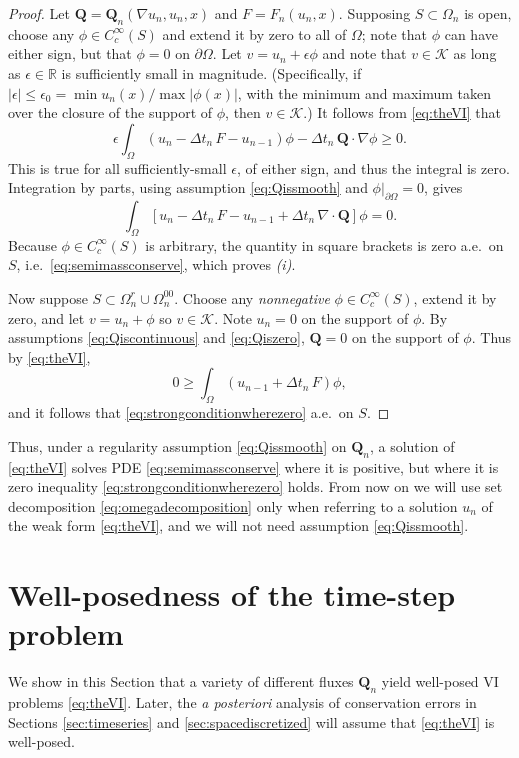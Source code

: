 \documentclass[final,onefignum]{siamart190516}
\newcommand\bQ{\mathbf{Q}}
\newcommand{\Div}{\nabla\cdot}
\newcommand\eps{\epsilon}
\newcommand{\grad}{\nabla}
\newcommand\RR{\mathbb{R}}
\begin{document}
\begin{proof}  Let $\bQ = \bQ_n(\grad u_n,u_n,x)$ and $F=F_n(u_n,x)$.  Supposing $S \subset \Omega_n$ is open, choose any $\phi\in C_c^\infty(S)$ and extend it by zero to all of $\Omega$; note that $\phi$ can have either sign, but that $\phi=0$ on $\partial\Omega$.  Let $v = u_n + \eps \phi$ and note that $v \in \mathcal{K}$ as long as $\eps\in\RR$ is sufficiently small in magnitude.  (Specifically, if $|\eps|\le \eps_0 = \min u_n(x) / \max |\phi(x)|$, with the minimum and maximum taken over the closure of the support of $\phi$, then $v \in \mathcal{K}$.)  It follows from \eqref{eq:theVI} that
   $$\eps \int_\Omega \left(u_n - \Delta t_n\,F - u_{n-1}\right)\phi - \Delta t_n\,\bQ \cdot \grad \phi \ge 0.$$
This is true for all sufficiently-small $\eps$, of either sign, and thus the integral is zero.  Integration by parts, using assumption \eqref{eq:Qissmooth} and $\phi\big|_{\partial\Omega}=0$, gives
   $$\int_\Omega \left[ u_n - \Delta t_n\,F - u_{n-1} + \Delta t_n\,\Div\bQ \right]\phi = 0.$$
Because $\phi\in C_c^\infty(S)$ is arbitrary, the quantity in square brackets is zero a.e.~on $S$, i.e.~\eqref{eq:semimassconserve}, which proves \emph{(i)}.

Now suppose $S \subset \Omega_n^r \cup \Omega_n^{00}$.  Choose any \emph{nonnegative} $\phi\in C_c^\infty(S)$, extend it by zero, and let $v = u_n + \phi$ so $v\in\mathcal{K}$.  Note $u_n=0$ on the support of $\phi$.  By assumptions \eqref{eq:Qiscontinuous} and \eqref{eq:Qiszero}, $\bQ=0$ on the support of $\phi$.  Thus by \eqref{eq:theVI},
    $$0 \ge \int_{\Omega} \left(u_{n-1} + \Delta t_n\, F\right) \phi,$$
and it follows that \eqref{eq:strongconditionwherezero} a.e.~on $S$. \end{proof}

Thus, under a regularity assumption \eqref{eq:Qissmooth} on $\bQ_n$, a solution of \eqref{eq:theVI} solves PDE \eqref{eq:semimassconserve} where it is positive, but where it is zero inequality \eqref{eq:strongconditionwherezero} holds.  From now on we will use set decomposition \eqref{eq:omegadecomposition} only when referring to a solution $u_n$ of the weak form \eqref{eq:theVI}, and we will not need assumption \eqref{eq:Qissmooth}.


\section{Well-posedness of the time-step problem} \label{sec:wellposed}

We show in this Section that a variety of different fluxes $\bQ_n$ yield well-posed VI problems \eqref{eq:theVI}.  Later, the \emph{a posteriori} analysis of conservation errors in Sections \ref{sec:timeseries} and \ref{sec:spacediscretized} will assume that \eqref{eq:theVI} is well-posed.
\end{document}
